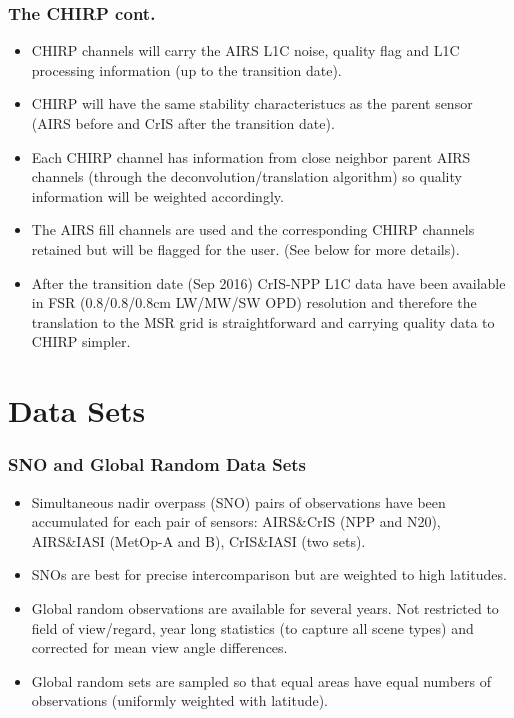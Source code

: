\documentclass[10pt,t]{beamer}
\begin{document}
\begin{frame}
  \frametitle{The CHIRP cont.}
  \begin{itemize}
  \item CHIRP channels will carry the AIRS L1C noise, quality flag and L1C processing information (up to the transition date).
    \item CHIRP will have the same stability characteristucs as the parent sensor (AIRS before and CrIS after the transition date).
  \item Each CHIRP channel has information from close neighbor parent AIRS channels (through the deconvolution/translation algorithm) so quality information will be weighted accordingly.
  \item The AIRS fill channels are used and the corresponding CHIRP channels retained  but will be flagged for the user. (See below for more details).
  \item After the transition date (Sep 2016) CrIS-NPP L1C data have been available in FSR (0.8/0.8/0.8cm LW/MW/SW OPD) resolution and therefore the translation to the MSR grid is straightforward and carrying quality data to CHIRP simpler.
  \end{itemize}
\end{frame}

\section{Data Sets}
\begin{frame}
  \frametitle{SNO and Global Random Data Sets}
  \begin{itemize}
  \item Simultaneous nadir overpass (SNO) pairs of observations have been accumulated for each pair of sensors: AIRS\&CrIS (NPP and N20),  AIRS\&IASI (MetOp-A and B), CrIS\&IASI (two sets).
  \item SNOs are best for precise intercomparison but are weighted to high latitudes.
  \item Global random observations are available for several years. Not restricted to field of view/regard, year long statistics (to capture all scene types) and corrected for mean view angle differences.
  \item Global random sets are sampled so that equal areas have equal numbers of observations (uniformly weighted with latitude).
  \end{itemize}
\end{frame}

\end{document}
